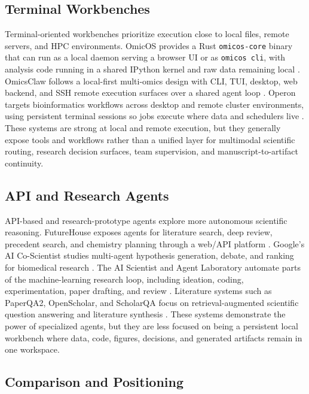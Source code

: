 \documentclass[sn-basic,Numbered,pdflatex]{sn-jnl}
\begin{document}
\subsection{Terminal Workbenches}

Terminal-oriented workbenches prioritize execution close to local files, remote servers, and HPC environments. OmicOS provides a Rust \texttt{omicos-core} binary that can run as a local daemon serving a browser UI or as \texttt{omicos cli}, with analysis code running in a shared IPython kernel and raw data remaining local \cite{omicOSOverview2026,omicOSServe2026,omicOSCLI2026}. OmicsClaw follows a local-first multi-omics design with CLI, TUI, desktop, web backend, and SSH remote execution surfaces over a shared agent loop \cite{omicsClaw2026}. Operon targets bioinformatics workflows across desktop and remote cluster environments, using persistent terminal sessions so jobs execute where data and schedulers live \cite{operonGitHub2026}. These systems are strong at local and remote execution, but they generally expose tools and workflows rather than a unified layer for multimodal scientific routing, research decision surfaces, team supervision, and manuscript-to-artifact continuity.

\subsection{API and Research Agents}

API-based and research-prototype agents explore more autonomous scientific reasoning. FutureHouse exposes agents for literature search, deep review, precedent search, and chemistry planning through a web/API platform \cite{futureHousePlatform2025}. Google's AI Co-Scientist studies multi-agent hypothesis generation, debate, and ranking for biomedical research \cite{googleCoScientist2025}. The AI Scientist and Agent Laboratory automate parts of the machine-learning research loop, including ideation, coding, experimentation, paper drafting, and review \cite{sakanaAIScientist2024,agentLaboratory2025}. Literature systems such as PaperQA2, OpenScholar, and ScholarQA focus on retrieval-augmented scientific question answering and literature synthesis \cite{paperQA2024,openScholar2024,scholarQA2025}. These systems demonstrate the power of specialized agents, but they are less focused on being a persistent local workbench where data, code, figures, decisions, and generated artifacts remain in one workspace.

\subsection{Comparison and Positioning}
\end{document}
